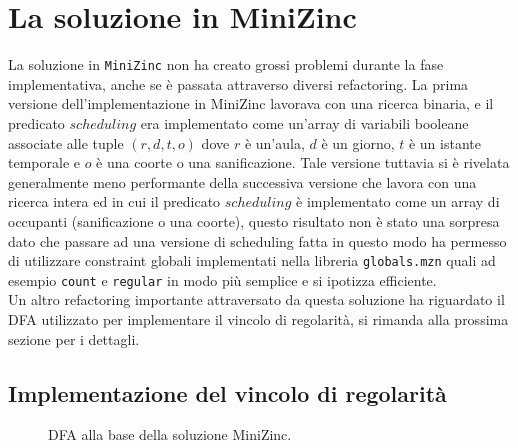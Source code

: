 \documentclass[12pt, italian, openany]{book}
\begin{document}
\chapter{La soluzione in MiniZinc}
La soluzione in \texttt{MiniZinc} non ha creato grossi problemi durante la fase implementativa, anche se è passata attraverso diversi refactoring. La prima versione dell'implementazione in MiniZinc lavorava con una ricerca binaria, e il predicato $scheduling$ era implementato come un'array di variabili booleane associate alle tuple $(r,d,t,o)$ dove $r$ è un'aula, $d$ è un giorno, $t$ è un istante temporale e $o$ è una coorte o una sanificazione. 
Tale versione tuttavia si è rivelata generalmente meno performante della successiva versione che lavora con una ricerca intera ed in cui il predicato $scheduling$ è implementato come un array di occupanti (sanificazione o una coorte), questo risultato non è stato una sorpresa dato che passare ad una versione di scheduling fatta in questo modo ha permesso di utilizzare constraint globali implementati nella libreria \texttt{globals.mzn} quali ad esempio \texttt{count} e \texttt{regular} in modo più semplice e si ipotizza efficiente.\\
Un altro refactoring importante attraversato da questa soluzione ha riguardato il DFA utilizzato per implementare il vincolo di regolarità, si rimanda alla prossima sezione per i dettagli.

\section{Implementazione del vincolo di regolarità}
\begin{figure}[ht] %
\centering %
\caption{DFA alla base della soluzione MiniZinc.}
\label{DFA}
\end{figure}
\end{document}
